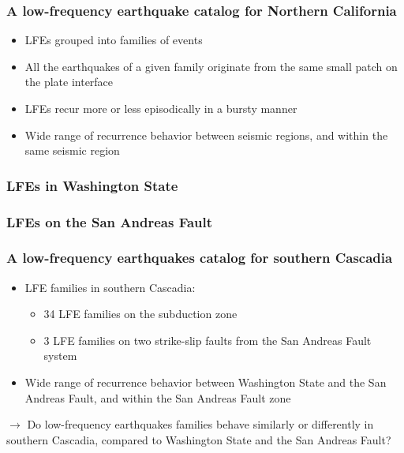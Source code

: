 \documentclass{beamer}
\begin{document}
	\begin{frame}
		\frametitle{A low-frequency earthquake catalog for Northern California}
		\begin{itemize}
			\item LFEs grouped into families of events
			\item All the earthquakes of a given family originate from the same small patch on the plate interface
			\item LFEs recur more or less episodically in a bursty manner
			\item Wide range of recurrence behavior between seismic regions, and within the same seismic region
		\end{itemize}
	\end{frame}

	\begin{frame}
		\frametitle{LFEs in Washington State}
	\end{frame}

	\begin{frame}
		\frametitle{LFEs on the San Andreas Fault}
	\end{frame}

	\begin{frame}
		\frametitle{A low-frequency earthquakes catalog for southern Cascadia}
		\begin{itemize}
			\item LFE families in southern Cascadia:
			\begin{itemize}
				\item 34 LFE families on the subduction zone
				\item 3 LFE families on two strike-slip faults from the San Andreas Fault system
			\end{itemize}
			\item Wide range of recurrence behavior between Washington State and the San Andreas Fault, and within the San Andreas Fault zone
		\end{itemize}
		
		\begin{block}{}
			$\rightarrow$ Do low-frequency earthquakes families behave similarly or differently in southern Cascadia, compared to Washington State and the San Andreas Fault?
		\end{block}
	\end{frame}
\end{document}
